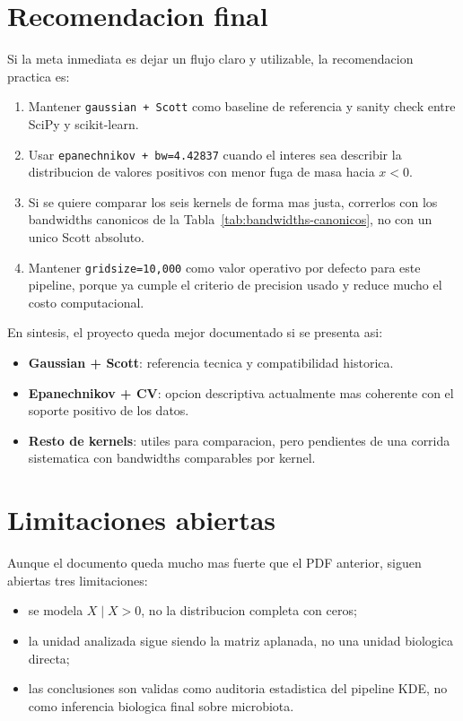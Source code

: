 \documentclass[11pt,a4paper]{article}
\begin{document}
\section{Recomendacion final}
Si la meta inmediata es dejar un flujo claro y utilizable, la recomendacion practica es:
\begin{enumerate}[leftmargin=1.5em]
\item Mantener \texttt{gaussian + Scott} como baseline de referencia y sanity check entre
      SciPy y scikit-learn.
\item Usar \texttt{epanechnikov + bw=4.42837} cuando el interes sea describir la distribucion de
      valores positivos con menor fuga de masa hacia \(x<0\).
\item Si se quiere comparar los seis kernels de forma mas justa, correrlos con los bandwidths
      canonicos de la Tabla~\ref{tab:bandwidths-canonicos}, no con un unico Scott absoluto.
\item Mantener \texttt{gridsize=10,000} como valor operativo por defecto para este pipeline, porque
      ya cumple el criterio de precision usado y reduce mucho el costo computacional.
\end{enumerate}

En sintesis, el proyecto queda mejor documentado si se presenta asi:
\begin{itemize}[leftmargin=1.5em]
\item \textbf{Gaussian + Scott}: referencia tecnica y compatibilidad historica.
\item \textbf{Epanechnikov + CV}: opcion descriptiva actualmente mas coherente con el soporte
      positivo de los datos.
\item \textbf{Resto de kernels}: utiles para comparacion, pero pendientes de una corrida sistematica
      con bandwidths comparables por kernel.
\end{itemize}

\section{Limitaciones abiertas}
Aunque el documento queda mucho mas fuerte que el PDF anterior, siguen abiertas tres limitaciones:
\begin{itemize}[leftmargin=1.5em]
\item se modela \(X \mid X > 0\), no la distribucion completa con ceros;
\item la unidad analizada sigue siendo la matriz aplanada, no una unidad biologica directa;
\item las conclusiones son validas como auditoria estadistica del pipeline KDE, no como inferencia
      biologica final sobre microbiota.
\end{itemize}
\end{document}
